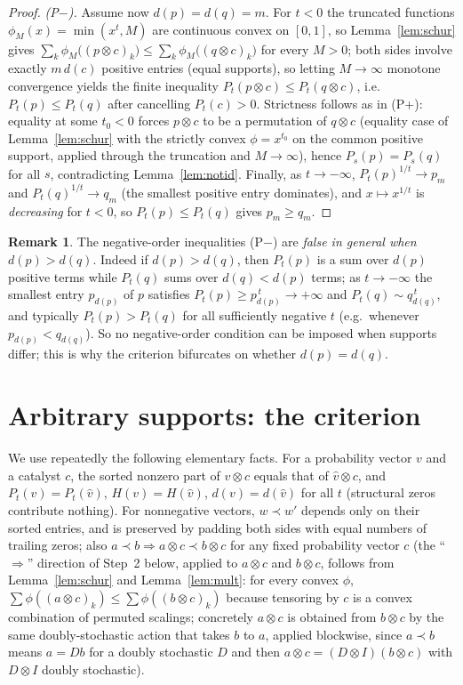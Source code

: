 \documentclass{amsart}
\theoremstyle{plain}
\theoremstyle{definition}
\newtheorem{remark}{Remark}
\newcommand{\maj}{\prec}
\begin{document}
\begin{proof}
\emph{(P$-$).} Assume now $d(p)=d(q)=m$. For $t<0$ the truncated functions
$\phi_M(x)=\min(x^t,M)$ are continuous convex on $[0,1]$, so Lemma~\ref{lem:schur}
gives $\sum_k\phi_M\big((p\otimes c)_k\big)\le\sum_k\phi_M\big((q\otimes c)_k\big)$ for
every $M>0$; both sides involve exactly $m\,d(c)$ positive entries (equal supports), so
letting $M\to\infty$ monotone convergence yields the finite inequality
$P_t(p\otimes c)\le P_t(q\otimes c)$, i.e.\ $P_t(p)\le P_t(q)$ after cancelling
$P_t(c)>0$. Strictness follows as in (P+): equality at some $t_0<0$ forces $p\otimes c$
to be a permutation of $q\otimes c$ (equality case of Lemma~\ref{lem:schur} with the
strictly convex $\phi=x^{t_0}$ on the common positive support, applied through the
truncation and $M\to\infty$), hence $P_s(p)=P_s(q)$ for all $s$, contradicting
Lemma~\ref{lem:notid}. Finally, as $t\to-\infty$, $P_t(p)^{1/t}\to p_m$ and
$P_t(q)^{1/t}\to q_m$ (the smallest positive entry dominates), and $x\mapsto x^{1/t}$
is \emph{decreasing} for $t<0$, so $P_t(p)\le P_t(q)$ gives $p_m\ge q_m$.
\end{proof}

\begin{remark}\label{rem:no-neg}
The negative-order inequalities (P$-$) are \emph{false in general when} $d(p)>d(q)$.
Indeed if $d(p)>d(q)$, then $P_t(p)$ is a sum over $d(p)$ positive terms while
$P_t(q)$ sums over $d(q)<d(p)$ terms; as $t\to-\infty$ the smallest entry $p_{d(p)}$ of
$p$ satisfies $P_t(p)\ge p_{d(p)}^{\,t}\to+\infty$ and $P_t(q)\sim q_{d(q)}^{\,t}$, and
typically $P_t(p)>P_t(q)$ for all sufficiently negative $t$ (e.g.\ whenever
$p_{d(p)}<q_{d(q)}$). So no negative-order condition can be imposed when supports
differ; this is why the criterion bifurcates on whether $d(p)=d(q)$.
\end{remark}

\section{Arbitrary supports: the criterion}\label{sec:support}

We use repeatedly the following elementary facts. For a probability vector $v$ and a
catalyst $c$, the sorted nonzero part of $v\otimes c$ equals that of $\hat v\otimes c$,
and $P_t(v)=P_t(\hat v)$, $H(v)=H(\hat v)$, $d(v)=d(\hat v)$ for all $t$ (structural
zeros contribute nothing). For nonnegative vectors, $w\maj w'$ depends only on their
sorted entries, and is preserved by padding both sides with equal numbers of trailing
zeros; also $a\maj b\Rightarrow a\otimes c\maj b\otimes c$ for any fixed probability
vector $c$ (the ``$\Rightarrow$'' direction of Step~2 below, applied to $a\otimes c$ and
$b\otimes c$, follows from Lemma~\ref{lem:schur} and Lemma~\ref{lem:mult}: for every
convex $\phi$, $\sum\phi((a\otimes c)_k)\le\sum\phi((b\otimes c)_k)$ because tensoring
by $c$ is a convex combination of permuted scalings; concretely $a\otimes c$ is
obtained from $b\otimes c$ by the same doubly-stochastic action that takes $b$ to $a$,
applied blockwise, since $a\maj b$ means $a=Db$ for a doubly stochastic $D$ and then
$a\otimes c=(D\otimes I)(b\otimes c)$ with $D\otimes I$ doubly stochastic).
\end{document}

